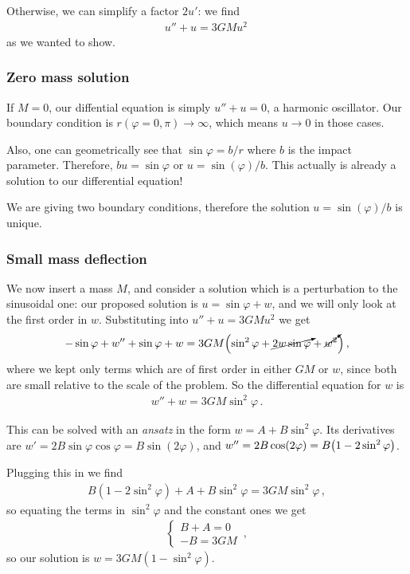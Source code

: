\documentclass[main.tex]{subfiles}
\begin{document}
Otherwise, we can simplify a factor \(2 u'\): we find 
%
\begin{align}
  u'' + u = 3 GMu^2
\,
\end{align}
%
as we wanted to show. 

\subsubsection{Zero mass solution}

If \(M=0\), our diffential equation is simply \(u''+u=0\), a harmonic oscillator.
Our boundary condition is \(r (\varphi = 0, \pi ) \rightarrow \infty \), which means \(u \rightarrow 0\) in those cases. 

Also, one can geometrically see that \(\sin \varphi = b/r\) where \(b\) is the impact parameter.
Therefore, \(bu = \sin \varphi \) or \(u = \sin(\varphi ) / b \). This actually is already a solution to our differential equation! 

We are giving two boundary conditions, therefore the solution \(u = \sin(\varphi ) / b \) is unique. 

\subsubsection{Small mass deflection}

We now insert a mass \(M\), and consider a solution which is a perturbation to the sinusoidal one: our proposed solution is \(u = \sin \varphi + w\), and we will only look at the first order in \(w\). Substituting into \(u'' + u = 3GM u^2\) we get 
%
\begin{align}
  - \sin \varphi + w'' + \sin \varphi + w = 3GM \qty(\sin^2 \varphi + \cancelto{}{2w  \sin \varphi} + \cancelto{}{w^2})
\,,
\end{align}
%
where we kept only terms which are of first order in either \(GM\) or \(w\), since both are small relative to the scale of the problem.
So the differential equation for \(w\) is 
%
\begin{align}
  w'' + w = 3GM \sin^2 \varphi 
\,.
\end{align}

This can be solved with an \emph{ansatz} in the form \(w = A + B \sin^2\varphi\).
Its derivatives are \(w' = 2B \sin \varphi \cos \varphi = B \sin(2\varphi )\), and \(w'' = 2B \cos(2 \varphi )= B \qty(1 - 2\sin^2\varphi )\). 

Plugging this in we find 
%
\begin{align}
  B(1 - 2 \sin^2 \varphi) + A + B \sin^2 \varphi = 3GM \sin^2 \varphi 
\,,
\end{align}
%
so equating the terms in \(\sin^2\varphi  \) and the constant ones we get 
%
\begin{align}
  \begin{cases}
    B+A = 0 \\
    -B = 3GM
  \end{cases}
\,,
\end{align}
%
so our solution is \(w = 3GM (1- \sin^2 \varphi )\). 
\end{document}

